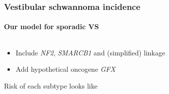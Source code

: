 \documentclass{beamer}
\begin{document}
\begin{frame}
    \frametitle{Vestibular schwannoma incidence}
    \framesubtitle{Our model for sporadic VS}

    \begin{columns}
        \begin{column}{0.5\textwidth}
        \begin{itemize}
            \item Include \emph{NF2}, \emph{SMARCB1} and (simplified) linkage
            \item Add hypothetical oncogene \emph{GFX}
        \end{itemize}

        \;

        Risk of each subtype looks like


\end{column}
\end{columns}
\end{frame}
\end{document}
